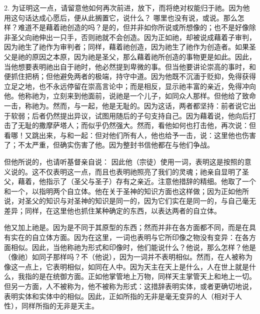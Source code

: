 2. 为证明这一点，请留意他如何再次前进，放下，而将绝对权能归于祂。因为他用这句话达成心愿后，便从此搁置它，说什么？ 哪里也没有说，或说。那么怎样？难道不是藉着祂创造的吗？是的，但并非如你所说或所想像的；也不是好像除非圣父向祂伸出一只手，否则祂就不会创造。因为正如祂，却被说成藉着子审判，因为祂生了祂作为审判者；同样，藉着祂创造，因为祂生了祂作为创造者。如果圣父是祂的原因之本原，因为祂是圣父，那么藉着祂所创造的事物更是如此。因此，当他想要表明祂出自于祂时，他必然提到卑微的事。但当他要讲论崇高的事时，和便抓住把柄；但他避免两者的极端，持守中道。因为他既不沉湎于贬抑，免得获得立足之地，也不永远停留在崇高言论中；而是相反，显示祂丰富的亲近，免得冲向他。他称祂为，立刻来到他面前，说祂是一个儿子，如同众人那样。但他给了致命一击，称祂为。然而，与一起，他是无耻的。因为这话，两者都坚持：前者说它出于软弱；后者仍然提出异议，试图用随后的子句支持自己。因为藉着说，他向后打击了无耻的撒摩萨塔人；而似乎仍然强大。然而，看他如何也打击他，再次说：但看哪！又跳出来，与和一起：但对他们所有人，他也给予一击，说：这里他也伤害了；不太严重，但确实伤害了他。因为整封书信他都在与他们争战。\par

但他所说的，也请听基督亲自说： 因此他（宗徒）使用一词，表明这是按照的意义说的。这不仅表明这一点，而且也表明祂照亮了我们的灵魂；祂亲自显明了圣父，藉着，他指示了（圣父与圣子）存有之亲近。注意他措辞的精细。他取了一个和一个，以指明两个自立体。他在关于圣神的知识方面也这样做；因为正如他所说，对圣父的知识与对圣神的知识是同一的，因为它们实在是同一的，与自己毫无差异；同样，在这里他也抓住某种确定的东西，以表达两者的自立体。\par

他又加上祂是。因为是不同于其原型的东西；然而并非在各方面都不同，而是在具有实在的自立体方面。因为在这里，一词也表明与它所印像之物没有变异：在各方面相似。因此，当他称祂为形式和印像时，他们能说什么？他说，那么怎样？他是（像祂）如同子那样吗？不（他说），因为一词并不表明相似。然而，在人被称为像这一点上，它表明相似，如同在人中。因为天主在天上是什么，人在世上就是什么，我指的是在统御方面。正如他掌管地上万物，同样天主掌管天上和地上一切。但另一方面，人不被称为，他不被称为形式：这措辞表明实体，或者更确切地说，表明实体和实体中的相似。因此，正如所指的无非是毫无变异的人（相对于人性），同样所指的无非是天主。\par

